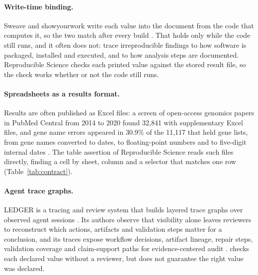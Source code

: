 \paragraph{Write-time binding.} Sweave and showyourwork write each value into the document from the
code that computes it, so the two match after every build \citep{leisch2002sweave,luger2021mapping}. That
holds only while the code still runs, and it often does not: \citet{piccolo2016tools} trace
irreproducible findings to how software is packaged, installed and executed, and to how analysis
steps are documented. Reproducible Science checks each printed value against the stored result file, so the check
works whether or not the code still runs.

\paragraph{Spreadsheets as a results format.} Results are often published as Excel files: a
screen of open-access genomics papers in PubMed Central from 2014 to 2020 found 32{,}841 with
supplementary Excel files, and gene name errors appeared in 30.9\% of the 11{,}117 that held gene
lists, from gene names converted to dates, to floating-point numbers and to five-digit internal
dates \citep{abeysooriya2021genenames}. The table assertion of Reproducible Science reads such files directly,
finding a cell by sheet, column and a selector that matches one row (Table~\ref{tab:contract}).

\paragraph{Agent trace graphs.} LEDGER is a tracing and review system that builds layered trace
graphs over observed agent sessions \citep{kim2026ledger}. Its authors observe that visibility
alone leaves reviewers to reconstruct which actions, artifacts and validation steps matter for a
conclusion, and its traces expose workflow decisions, artifact lineage, repair steps, validation
coverage and claim-support paths for evidence-centered audit \citep{kim2026ledger}. \reproverify{}
checks each declared value without a reviewer, but does not guarantee the right value was
declared.

